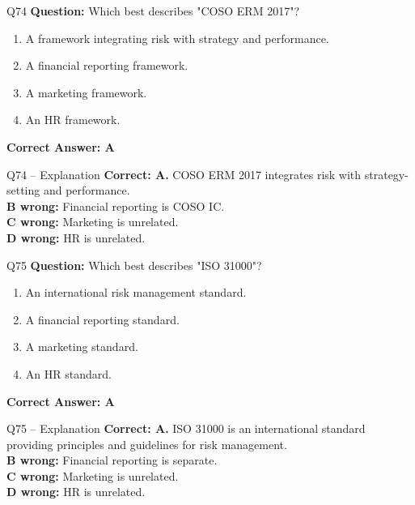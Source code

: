 \documentclass[aspectratio=169,10pt]{beamer}
\begin{document}
	\begin{frame}[t]{Q74}
		\small
		\textbf{Question:} Which best describes "COSO ERM 2017"?
		\begin{enumerate}[label=\Alph*.,itemsep=1pt,topsep=2pt]
			\item A framework integrating risk with strategy and performance.
			\item A financial reporting framework.
			\item A marketing framework.
			\item An HR framework.
		\end{enumerate}
		\vspace{4pt}
		\textbf{Correct Answer: A}
	\end{frame}
	
	\begin{frame}[t]{Q74 -- Explanation}
		\small
		\textbf{Correct: A.} COSO ERM 2017 integrates risk with strategy-setting and performance. \\[4pt]
		\textbf{B wrong:} Financial reporting is COSO IC. \\[2pt]
		\textbf{C wrong:} Marketing is unrelated. \\[2pt]
		\textbf{D wrong:} HR is unrelated.
	\end{frame}
	
	\begin{frame}[t]{Q75}
		\small
		\textbf{Question:} Which best describes "ISO 31000"?
		\begin{enumerate}[label=\Alph*.,itemsep=1pt,topsep=2pt]
			\item An international risk management standard.
			\item A financial reporting standard.
			\item A marketing standard.
			\item An HR standard.
		\end{enumerate}
		\vspace{4pt}
		\textbf{Correct Answer: A}
	\end{frame}
	
	\begin{frame}[t]{Q75 -- Explanation}
		\small
		\textbf{Correct: A.} ISO 31000 is an international standard providing principles and guidelines for risk management. \\[4pt]
		\textbf{B wrong:} Financial reporting is separate. \\[2pt]
		\textbf{C wrong:} Marketing is unrelated. \\[2pt]
		\textbf{D wrong:} HR is unrelated.
	\end{frame}
	
\end{document}
